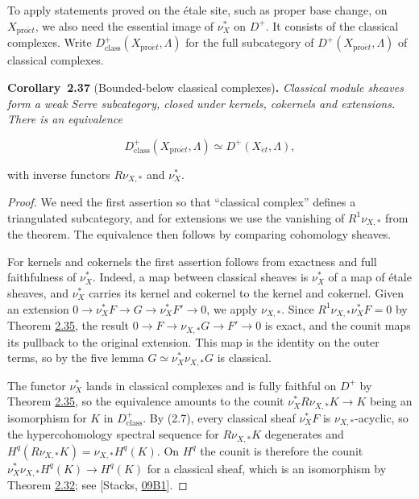 \documentclass[11pt]{article}
\newenvironment{bpstatement}[2]{\par\addvspace{0.6\baselineskip}\noindent\textbf{#1}#2\textbf{.}\enspace\ignorespaces}
  {\par\addvspace{0.4\baselineskip}}
\newenvironment{bpstatementit}[2]{\begin{bpstatement}{#1}{#2}\itshape\ignorespaces}{\end{bpstatement}}
\begin{document}
\label{bp108}%
To apply statements proved on the étale site, such as proper base change, on \(X_{\mathrm{pro}\acute{e}t}\), we also need the essential image of \(\nu_X^*\) on \(D^+\). It consists of the classical complexes. Write \(D^+_{\mathrm{class}}(X_{\mathrm{pro}\acute{e}t},\Lambda)\) for the full subcategory of \(D^+(X_{\mathrm{pro}\acute{e}t},\Lambda)\) of classical complexes.

\label{bp109}%
\begin{bpstatementit}{Corollary~2.37}{ (Bounded-below classical complexes)}
Classical module sheaves form a weak Serre subcategory, closed under kernels, cokernels and extensions. There is an equivalence

\[
D^+_{\mathrm{class}}(X_{\mathrm{pro}\acute{e}t},\Lambda)
\simeq D^+(X_{\acute{e}t},\Lambda),
\]

with inverse functors \(R\nu_{X,*}\) and \(\nu_X^*\).
\end{bpstatementit}

\begin{proof}[{Proof}]\label{bp110}%
We need the first assertion so that “classical complex” defines a triangulated subcategory, and for extensions we use the vanishing of \(R^1\nu_{X,*}\) from the theorem. The equivalence then follows by comparing cohomology sheaves.

For kernels and cokernels the first assertion follows from exactness and full faithfulness of \(\nu_X^*\). Indeed, a map between classical sheaves is \(\nu_X^*\) of a map of étale sheaves, and \(\nu_X^*\) carries its kernel and cokernel to the kernel and cokernel. Given an extension \(0\to\nu_X^*F\to G\to\nu_X^*F'\to0\), we apply \(\nu_{X,*}\). Since \(R^1\nu_{X,*}\nu_X^*F=0\) by Theorem \hyperref[bp103]{2.35}, the result \(0\to F\to\nu_{X,*}G\to F'\to0\) is exact, and the counit maps its pullback to the original extension. This map is the identity on the outer terms, so by the five lemma \(G\simeq\nu_X^*\nu_{X,*}G\) is classical.

The functor \(\nu_X^*\) lands in classical complexes and is fully faithful on \(D^+\) by Theorem \hyperref[bp103]{2.35}, so the equivalence amounts to the counit \(\nu_X^*R\nu_{X,*}K\to K\) being an isomorphism for \(K\) in \(D^+_{\mathrm{class}}\). By (2.7), every classical sheaf \(\nu_X^*F\) is \(\nu_{X,*}\)-acyclic, so the hypercohomology spectral sequence for \(R\nu_{X,*}K\) degenerates and \(H^q(R\nu_{X,*}K)=\nu_{X,*}H^q(K)\). On \(H^q\) the counit is therefore the counit \(\nu_X^*\nu_{X,*}H^q(K)\to H^q(K)\) for a classical sheaf, which is an isomorphism by Theorem \hyperref[bp95]{2.32}; see [Stacks, \href{https://stacks.math.columbia.edu/tag/09B1}{09B1}].
\end{proof}
\end{document}
